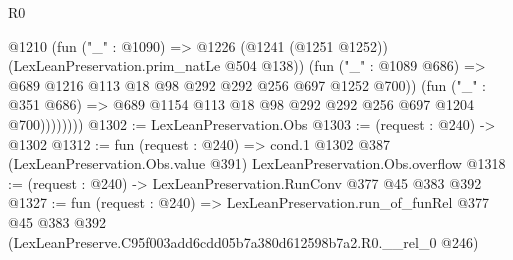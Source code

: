 \begin{lexlean}{R0}
\begin{coremodule}
                  @1210
                    (fun ("_" : @1090) =>
                    @1226 (@1241 (@1251 @1252)) (LexLeanPreservation.prim_natLe @504 @138))
                    (fun ("_" : @1089 @686) =>
                    @689 @1216 @113 @18 @98 @292 @292 @256 @697 @1252 @700))
                  (fun ("_" : @351 @686) =>
                  @689 @1154 @113 @18 @98 @292 @292 @256 @697 @1204 @700))))))))
@1302 := LexLeanPreservation.Obs
@1303 := (request : @240) -> @1302
@1312 := fun (request : @240) =>
  cond.{1} @1302 @387 (LexLeanPreservation.Obs.value @391) LexLeanPreservation.Obs.overflow
@1318 := (request : @240) -> LexLeanPreservation.RunConv @377 @45 @383 @392
@1327 := fun (request : @240) =>
  LexLeanPreservation.run_of_funRel
    @377
    @45
    @383
    @392
    (LexLeanPreserve.C95f003add6cdd05b7a380d612598b7a2.R0.__rel_0 @246)
\end{coremodule}
\end{lexlean}
